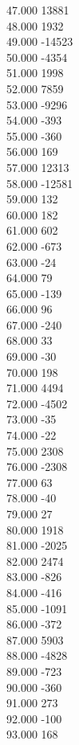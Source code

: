 { 47.000	13881 \\
 48.000	1932 \\
 49.000	-14523 \\
 50.000	-4354 \\
 51.000	1998 \\
 52.000	7859 \\
 53.000	-9296 \\
 54.000	-393 \\
 55.000	-360 \\
 56.000	169 \\
 57.000	12313 \\
 58.000	-12581 \\
 59.000	132 \\
 60.000	182 \\
 61.000	602 \\
 62.000	-673 \\
 63.000	-24 \\
 64.000	79 \\
 65.000	-139 \\
 66.000	96 \\
 67.000	-240 \\
 68.000	33 \\
 69.000	-30 \\
 70.000	198 \\
 71.000	4494 \\
 72.000	-4502 \\
 73.000	-35 \\
 74.000	-22 \\
 75.000	2308 \\
 76.000	-2308 \\
 77.000	63 \\
 78.000	-40 \\
 79.000	27 \\
 80.000	1918 \\
 81.000	-2025 \\
 82.000	2474 \\
 83.000	-826 \\
 84.000	-416 \\
 85.000	-1091 \\
 86.000	-372 \\
 87.000	5903 \\
 88.000	-4828 \\
 89.000	-723 \\
 90.000	-360 \\
 91.000	273 \\
 92.000	-100 \\
 93.000	168 \\
}
